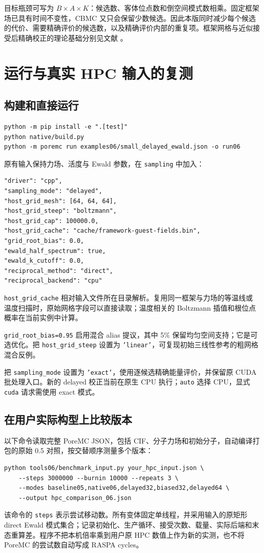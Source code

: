 \documentclass[11pt,a4paper]{article}
\newcommand{\code}[1]{\texttt{\small #1}}
\begin{document}
目标瓶颈可写为 $B\times A\times K$：候选数、客体位点数和倒空间模式数相乘。固定框架场已具有时间不变性，CBMC 又只会保留少数候选。因此本版同时减少每个候选的代价、需要精确评价的候选数，以及精确评价内部的重复项。框架网格与近似接受后精确校正的理论基础分别见文献 \cite{ran2025,christen2005,dubbeldam2013}。


\clearpage


\section{运行与真实 HPC 输入的复测}
\subsection{构建和直接运行}
\begin{lstlisting}
python -m pip install -e ".[test]"
python native/build.py
python -m poremc run examples06/small_delayed_ewald.json -o run06
\end{lstlisting}
原有输入保持力场、活度与 Ewald 参数，在 \code{sampling} 中加入：
\begin{lstlisting}
"driver": "cpp",
"sampling_mode": "delayed",
"host_grid_mesh": [64, 64, 64],
"host_grid_steep": "boltzmann",
"host_grid_cap": 100000.0,
"host_grid_cache": "cache/framework-guest-fields.bin",
"grid_root_bias": 0.0,
"ewald_half_spectrum": true,
"ewald_k_cutoff": 0.0,
"reciprocal_method": "direct",
"reciprocal_backend": "cpu"
\end{lstlisting}
\code{host\_grid\_cache} 相对输入文件所在目录解析。复用同一框架与力场的等温线或温度扫描时，原始网格字段可以直接读取；温度相关的 Boltzmann 插值和根位点概率在当前实例中计算。

\code{grid\_root\_bias=0.95} 启用混合 alias 提议，其中 5\% 保留均匀空间支持；它是可选优化。把 \code{host\_grid\_steep} 设置为 \code{'linear'}，可复现初始三线性参考的粗网格混合反例。

把 \code{sampling\_mode} 设置为 \code{'exact'}，使用逐候选精确能量评价，并保留原 CUDA 批处理入口。新的 delayed 校正当前在原生 CPU 执行；\code{auto} 选择 CPU，显式 \code{cuda} 请求需使用 exact 模式。

\subsection{在用户实际构型上比较版本}
以下命令读取完整 PoreMC JSON，包括 CIF、分子力场和初始分子，自动编译打包的原始 0.5 对照，按交替顺序测量多个版本：
\begin{lstlisting}
python tools06/benchmark_input.py your_hpc_input.json \
    --steps 3000000 --burnin 10000 --repeats 3 \
    --modes baseline05,native06,delayed32,biased32,delayed64 \
    --output hpc_comparison_06.json
\end{lstlisting}
该命令的 \code{steps} 表示尝试移动数。所有变体固定单线程，并采用输入的原矩形 direct Ewald 模式集合；记录初始化、生产循环、接受次数、载量、实际后端和末态重算差。程序不把本机倍率乘到用户原 HPC 数值上作为新的实测，也不将 PoreMC 的尝试数自动写成 RASPA cycles。
\end{document}
